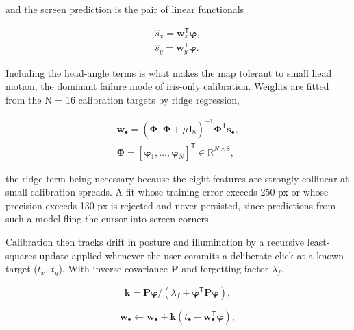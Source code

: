 and the screen prediction is the pair of linear functionals

\begin{equation}
\label{eq:106}
\begin{aligned}
\hat{s}_x = \mathbf{w}_x^{\mathsf{T}} \boldsymbol{\varphi}, \\
\hat{s}_y = \mathbf{w}_y^{\mathsf{T}} \boldsymbol{\varphi}.
\end{aligned}
\end{equation}

Including the head-angle terms is what makes the map tolerant to small head motion, the dominant failure mode of iris-only calibration. Weights are fitted from the N = 16 calibration targets by ridge regression,

\begin{equation}
\label{eq:107}
\begin{aligned}
\mathbf{w}_{\bullet} = ( \boldsymbol{\Phi}^{\mathsf{T}}\boldsymbol{\Phi} + \mu \mathbf{I}_{8} )^{-1} \boldsymbol{\Phi}^{\mathsf{T}} \mathbf{s}_{\bullet} , \\
\boldsymbol{\Phi} = [ \boldsymbol{\varphi}_{1}, \dots , \boldsymbol{\varphi}_N ]^{\mathsf{T}} \in \mathbb{R}^{N\times 8},
\end{aligned}
\end{equation}

the ridge term being necessary because the eight features are strongly collinear at small calibration spreads. A fit whose training error exceeds 250 px or whose precision exceeds 130 px is rejected and never persisted, since predictions from such a model fling the cursor into screen corners.

Calibration then tracks drift in posture and illumination by a recursive least-squares update  applied whenever the user commits a deliberate click at a known target ($t_{x}$, $t_{y}$). With inverse-covariance \textbf{P} and forgetting factor $\lambda_{f}$,

\begin{equation}
\label{eq:108}
\mathbf{k} = \mathbf{P} \boldsymbol{\varphi} / ( \lambda _f + \boldsymbol{\varphi}^{\mathsf{T}} \mathbf{P} \boldsymbol{\varphi} ),
\end{equation}

\begin{equation}
\label{eq:109}
\mathbf{w}_{\bullet} \leftarrow \mathbf{w}_{\bullet} + \mathbf{k} ( t_{\bullet} - \mathbf{w}_{\bullet} ^{\mathsf{T}} \boldsymbol{\varphi} ),
\end{equation}

